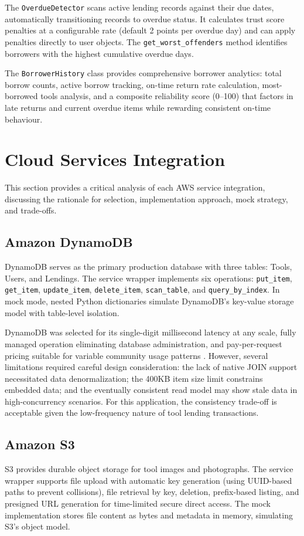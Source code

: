 \documentclass[conference]{IEEEtran}
\begin{document}
The \texttt{OverdueDetector} scans active lending records against their due dates, automatically transitioning records to overdue status. It calculates trust score penalties at a configurable rate (default 2 points per overdue day) and can apply penalties directly to user objects. The \texttt{get\_worst\_offenders} method identifies borrowers with the highest cumulative overdue days.

The \texttt{BorrowerHistory} class provides comprehensive borrower analytics: total borrow counts, active borrow tracking, on-time return rate calculation, most-borrowed tools analysis, and a composite reliability score (0--100) that factors in late returns and current overdue items while rewarding consistent on-time behaviour.

\section{Cloud Services Integration}

This section provides a critical analysis of each AWS service integration, discussing the rationale for selection, implementation approach, mock strategy, and trade-offs.

\subsection{Amazon DynamoDB}
DynamoDB serves as the primary production database with three tables: Tools, Users, and Lendings. The service wrapper implements six operations: \texttt{put\_item}, \texttt{get\_item}, \texttt{update\_item}, \texttt{delete\_item}, \texttt{scan\_table}, and \texttt{query\_by\_index}. In mock mode, nested Python dictionaries simulate DynamoDB's key-value storage model with table-level isolation.

DynamoDB was selected for its single-digit millisecond latency at any scale, fully managed operation eliminating database administration, and pay-per-request pricing suitable for variable community usage patterns \cite{aws_dynamodb}. However, several limitations required careful design consideration: the lack of native JOIN support necessitated data denormalization; the 400KB item size limit constrains embedded data; and the eventually consistent read model may show stale data in high-concurrency scenarios. For this application, the consistency trade-off is acceptable given the low-frequency nature of tool lending transactions.

\subsection{Amazon S3}
S3 provides durable object storage for tool images and photographs. The service wrapper supports file upload with automatic key generation (using UUID-based paths to prevent collisions), file retrieval by key, deletion, prefix-based listing, and presigned URL generation for time-limited secure direct access. The mock implementation stores file content as bytes and metadata in memory, simulating S3's object model.
\end{document}

